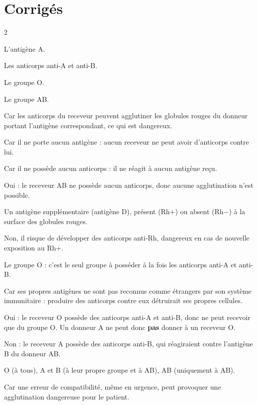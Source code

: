 \section{Corrigés}
\begin{multicols}{2}

L'antigène A.

Les anticorps anti-A et anti-B.

Le groupe O.

Le groupe AB.

Car les anticorps du receveur peuvent agglutiner les globules rouges du donneur portant
l'antigène correspondant, ce qui est dangereux.

Car il ne porte aucun antigène : aucun receveur ne peut avoir d'anticorps contre lui.

Car il ne possède aucun anticorps : il ne réagit à aucun antigène reçu.

Oui : le receveur AB ne possède aucun anticorps, donc aucune agglutination n'est
possible.

Un antigène supplémentaire (antigène D), présent (Rh$+$) ou absent (Rh$-$) à la surface
des globules rouges.

Non, il risque de développer des anticorps anti-Rh, dangereux en cas de nouvelle
exposition au Rh$+$.

Le groupe O : c'est le seul groupe à posséder à la fois les anticorps anti-A et anti-B.

Car ses propres antigènes ne sont pas reconnus comme étrangers par son système
immunitaire : produire des anticorps contre eux détruirait ses propres cellules.

Oui : le receveur O possède des anticorps anti-A et anti-B, donc ne peut recevoir que du
groupe O. Un donneur A ne peut donc \textbf{pas} donner à un receveur O.

Non : le receveur A possède des anticorps anti-B, qui réagiraient contre l'antigène B du
donneur AB.

O (à tous), A et B (à leur propre groupe et à AB), AB (uniquement à AB).

Car une erreur de compatibilité, même en urgence, peut provoquer une agglutination
dangereuse pour le patient.


\end{multicols}
